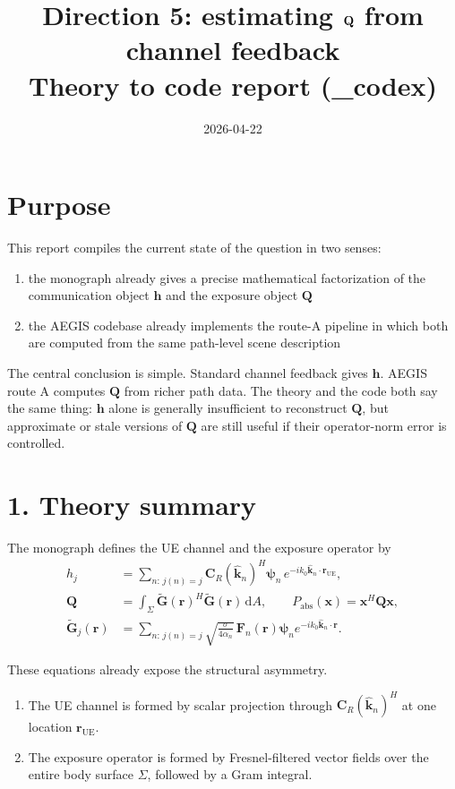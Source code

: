 \documentclass[11pt]{article}
\title{Direction 5: estimating $\QQ$ from channel feedback\\
\large Theory to code report (\_codex)}
\author{}
\date{2026-04-22}
\newcommand{\hh}{\mathbf{h}}
\newcommand{\QQ}{\mathbf{Q}}
\newcommand{\Gh}{\widetilde{\mathbf{G}}}
\newcommand{\x}{\mathbf{x}}
\newcommand{\dd}{\mathrm{d}}
\begin{document}
\maketitle

\section*{Purpose}

This report compiles the current state of the question in two senses:
\begin{enumerate}
  \item the monograph already gives a precise mathematical factorization of
  the communication object $\hh$ and the exposure object $\QQ$
  \item the AEGIS codebase already implements the route-A pipeline in which
  both are computed from the same path-level scene description
\end{enumerate}

The central conclusion is simple. Standard channel feedback gives $\hh$.
AEGIS route A computes $\QQ$ from richer path data. The theory and the code
both say the same thing: $\hh$ alone is generally insufficient to reconstruct
$\QQ$, but approximate or stale versions of $\QQ$ are still useful if their
operator-norm error is controlled.

\section*{1. Theory summary}

The monograph defines the UE channel and the exposure operator by
\begin{align}
  h_j
  &= \sum_{n:\,j(n)=j}
  \mathbf{C}_R(\hat{\mathbf{k}}_n)^H \boldsymbol{\psi}_n\,
  e^{-ik_0\hat{\mathbf{k}}_n\cdot \mathbf{r}_{\mathrm{UE}}},
  \\
  \QQ
  &= \int_\Sigma \Gh(\mathbf{r})^H \Gh(\mathbf{r})\,\dd A,
  \qquad
  P_{\mathrm{abs}}(\x)=\x^H\QQ\x,
  \\
  \Gh_j(\mathbf{r})
  &= \sum_{n:\,j(n)=j}
  \sqrt{\frac{\sigma}{4\alpha_n}}\,
  \mathbf{F}_n(\mathbf{r})\boldsymbol{\psi}_n
  e^{-ik_0\hat{\mathbf{k}}_n\cdot \mathbf{r}}.
\end{align}

These equations already expose the structural asymmetry.

\begin{enumerate}
  \item The UE channel is formed by scalar projection through
  $\mathbf{C}_R(\hat{\mathbf{k}}_n)^H$ at one location
  $\mathbf{r}_{\mathrm{UE}}$.
  \item The exposure operator is formed by Fresnel-filtered vector fields over
  the entire body surface $\Sigma$, followed by a Gram integral.
\end{enumerate}
\end{document}
